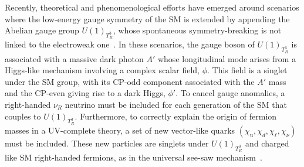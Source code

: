 Recently, theoretical and phenomenological efforts have emerged around scenarios where the low-energy gauge symmetry of the SM is extended by appending the Abelian gauge group $U(1)_{T^{3}_{R}}$, whose spontaneous symmetry-breaking is not linked to the electroweak one~\parencite{Dutta2019, Dutta2020, Dutta2020b,Dutta2022, PhysRevD.107.095019, Dutta2023}. In these scenarios, the gauge boson of $U(1)_{T^3_R}$ is associated with a massive dark photon $A'$ whose longitudinal mode arises from a Higgs-like mechanism involving a complex scalar field, $\phi$. This field is a singlet under the SM group, with its CP-odd component associated with the $A'$ mass and the CP-even giving rise to a dark Higgs, $\phi'$. To cancel gauge anomalies, a right-handed $\nu_R$ neutrino must be included for each generation of the SM that couples to $U(1)_{T^3_R}$. Furthermore, to correctly explain the origin of fermion masses in a UV-complete theory, a set of new vector-like quarks $(\chi_\mathrm{u}, \chi_d,\chi_\ell, \chi_\nu)$ must be included. These new particles are singlets under $U(1)_{T^3_R}$ and charged like SM right-handed fermions, as in the universal see-saw mechanism~\parencite{Berezhiani, Chang1987, Davidson1987, Rajpoot1987, Babu1989, Babu1990}.

